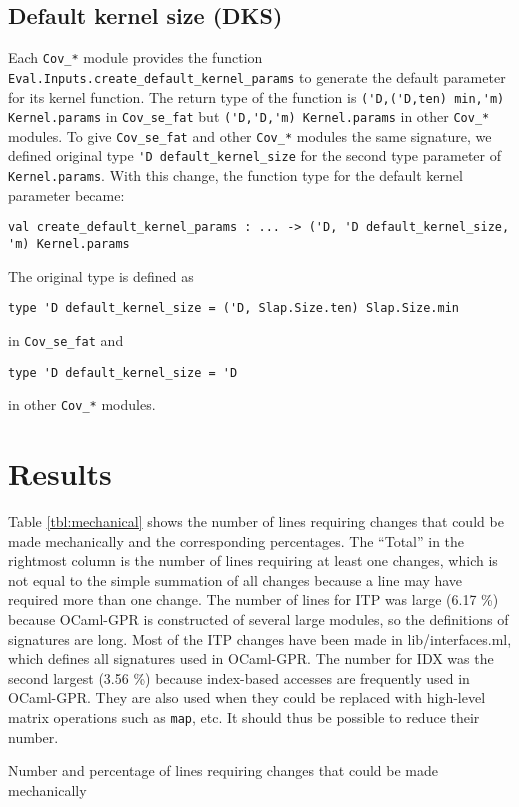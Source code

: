 \documentclass[10pt,a4paper]{article}
\begin{document}
\subsection{Default kernel size (DKS)}
\label{sec:DKS}

Each \lstinline|Cov_*| module provides the function
\lstinline|Eval.Inputs.create_default_kernel_params| to generate the default
parameter for its kernel function.
The return type of the function is \lstinline|('D,('D,ten) min,'m) Kernel.params|
in \lstinline|Cov_se_fat| but \lstinline|('D,'D,'m) Kernel.params| in other
\lstinline|Cov_*| modules.
To give \lstinline|Cov_se_fat| and other \lstinline|Cov_*| modules the same signature,
we defined original type \lstinline|'D default_kernel_size| for the second type
parameter of \lstinline|Kernel.params|.
With this change, the function type for the default kernel parameter became:
\begin{lstlisting}
val create_default_kernel_params : ... -> ('D, 'D default_kernel_size, 'm) Kernel.params
\end{lstlisting}
The original type is defined as
\begin{lstlisting}
type 'D default_kernel_size = ('D, Slap.Size.ten) Slap.Size.min
\end{lstlisting}
in \lstinline|Cov_se_fat| and
\begin{lstlisting}
type 'D default_kernel_size = 'D
\end{lstlisting}
in other \lstinline|Cov_*| modules.

\section{Results}
\label{sec:results}

Table \ref{tbl:mechanical} shows the number of lines requiring changes that could be made
mechanically and the corresponding percentages.
The ``Total'' in the rightmost column is the number of lines requiring at least one changes,
which is not equal to the simple summation of all changes because a line may have required
more than one change.
The number of lines for ITP was large (6.17 \%) because OCaml-GPR is constructed of several large
modules, so the definitions of signatures are long.
Most of the ITP changes have been made in lib/interfaces.ml, which defines all signatures used in
OCaml-GPR.
The number for IDX was the second largest (3.56 \%) because index-based accesses are
frequently used in OCaml-GPR.
They are also used when they could be replaced with high-level matrix operations such as
\lstinline|map|, etc.
It should thus be possible to reduce their number.
\begin{table}[tbp]
  \caption{Number and percentage of lines requiring changes that could be made mechanically}
  \label{tbl:mechanical}
  \centering
  {\footnotesize}
\end{table}
\end{document}
